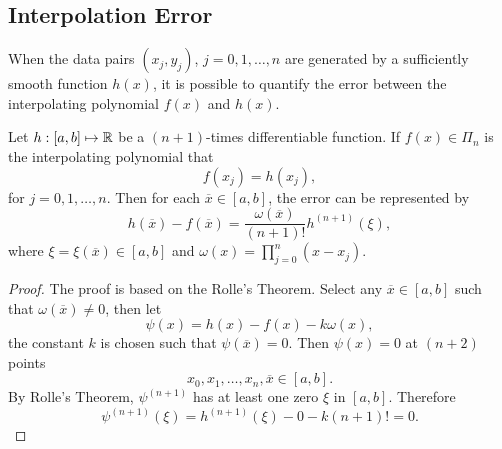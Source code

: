 \subsection{Interpolation Error}
\label{SSec: 2-Int-Err}
When the data pairs $(x_j, y_j)$, $j=0,1,\dots, n$ are generated by a sufficiently smooth function $h(x)$, it is possible to quantify the error between the interpolating polynomial $f(x)$ and $h(x)$. 
\begin{theorem}
\label{Thm: 2-Int-err}
    Let $h: [a, b]\mapsto \mathbb R$ be a $(n+1)$-times differentiable function. If $f(x)\in\Pi_n$ is the interpolating polynomial that 
    $$f(x_j) = h(x_j),$$
    for $j=0,1,\dots, n$. Then for each $\overline{x}\in [a, b]$, the error can be represented by 
    \begin{equation}
        h(\overline{x}) - f(\overline{x}) = \frac{\omega(\overline{x})}{(n+1)!} h^{(n+1)}(\xi),
    \end{equation}
    where $\xi = \xi(\overline{x})\in [a, b]$ and $\omega(x) = \prod_{j=0}^n (x - x_j)$.
\end{theorem}
\begin{proof}
    The proof is based on the Rolle's Theorem. Select any $\overline{x}\in[a, b]$ such that $\omega(\overline{x})\neq 0$, then let 
    $$\psi(x) = h(x) - f(x) - k\omega (x),$$
    the constant $k$ is chosen such that $\psi(\overline{x}) = 0$. Then $\psi(x) = 0$ at $(n+2)$ points 
    $$x_0, x_1, \dots, x_n, \overline{x}\in [a, b].$$
    By Rolle's Theorem, $\psi^{(n+1)}$ has at least one zero $\xi$ in $[a,b]$. Therefore
    \begin{equation}
        \psi^{(n+1)}(\xi) = h^{(n+1)}(\xi) - 0 - k(n+1)! = 0.
    \end{equation}
\end{proof}

